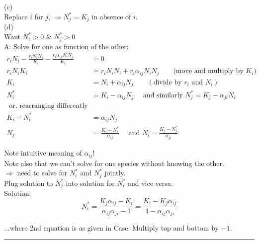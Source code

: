 \documentclass{article}
\newcommand{\ind}{\-\hspace{1cm}}
\begin{document}
(c)\\
Replace $i$ for $j$, $\Rightarrow N_j^* = K_j$ in absence of $i$.\\

(d)\\
Want $N_i^* > 0$ \&  $N_j^* > 0$\\
A: Solve for one as function of the other:\\
\begin{align*}
	r_i N_i - \frac{r_i N_i N_i}{K_i} - \frac{ r_i \alpha_{ij} N_i N_j}{K_i} & =0\\
	r_i N_i K_i & = r_i N_i N_i + r_i \alpha_{ij} N_i N_j   \quad \quad \text{(move and  multiply by }K_i)\\
	K_i & = N_i + \alpha_{ij}N_j  \quad \quad (\text{divide by } r_i \text{  and } N_i)\\[1em]
	N_i^* & = K_i - \alpha_{ij} N_j  \quad \text{ and similarly }	N_j^* = K_j - \alpha_{ji} N_i\\[1em]
	\text{ or, rearranging differently} \\
	K_i - N_i^* & = \alpha_{ij} N_j\\
	N_j & = \frac{K_i - N_i^*}{\alpha_{ij}} \quad \text{ and } N_i  = \frac{K_j - N_j^*}{\alpha_{ji}}
 \end{align*}
 
Note intuitive meaning of $\alpha_{ij}$!\\
Note also that we can't solve for one species without knowing the other.\\
\ind $\Rightarrow$ need to solve for $N_i^*$ and $N_j^*$ jointly.\\
\ind Plug solution to $N_j^*$ into solution for $N_i^*$ and vice versa.\\

Solution:\\
\begin{equation*}
	N_i^* = \frac{K_j \alpha_{ij} - K_i}{\alpha_{ij} \alpha_{ji}-1} = \frac{K_i - K_j \alpha_{ij}}{1-\alpha_{ij}\alpha_{ji}}
\end{equation*}
\begin{center}
	...where 2nd equation is as given in Case.  Multiply top and bottom by $-1$.
\end{center}

\rule[0.5ex]{\linewidth}{1pt}
\end{document}
